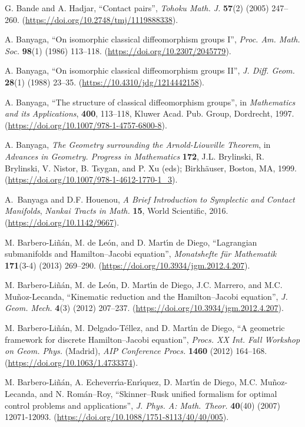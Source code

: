 \documentclass[12pt]{report}
\begin{document}
\begin{thebibliography}{999}
G. Bande and A. Hadjar, 
``Contact pairs'', 
{\sl Tohoku Math. J.} {\bf 57}(2) (2005) 247--260.
(\url{https://doi.org/10.2748/tmj/1119888338}).

A. Banyaga,
``On isomorphic classical diffeomorphism groups I'',
{\sl Proc. Am. Math. Soc.} \textbf{98}(1) (1986) 113--118.
(\url{https://doi.org/10.2307/2045779}).

A. Banyaga,
``On isomorphic classical diffeomorphism groups II'',
{\sl J. Diff. Geom.} \textbf{28}(1) (1988) 23--35.
(\url{https://10.4310/jdg/1214442158}).

A. Banyaga,
``The structure of classical diffeomorphism groups'',
in {\sl Mathematics and its Applications}, \textbf{400}, 113--118, Kluwer Acad. Pub. Group, Dordrecht, 1997.
(\url{https://doi.org/10.1007/978-1-4757-6800-8}).

A. Banyaga, 
{\it The Geometry surrounding the Arnold-Liouville Theorem},
in  {\sl Advances in Geometry. Progress in Mathematics} {\bf 172}, 
J.L. Brylinski, R. Brylinski, V. Nistor, B. Tsygan, and P. Xu (eds);
Birkh\"auser, Boston, MA, 1999. (\url{https://doi.org/10.1007/978-1-4612-1770-1_3}).

A.~Banyaga and D.F. Houenou,
{\it A Brief Introduction to Symplectic and Contact Manifolds},
{\sl Nankai Tracts in Math.} {\bf 15},
World Scientific, 2016.
(\url{https://doi.org/10.1142/9667}).

M. Barbero-Li\~n\'an, M. de Le\'on, and D. Mart\'\i n de Diego,
``Lagrangian submanifolds and Hamilton--Jacobi equation'',
 {\sl Monatshefte f\"ur Mathematik}  {\bf 171}(3-4) (2013) 269--290.
(\url{https://doi.org/10.3934/jgm.2012.4.207}).

M. Barbero-Li\~n\'an, M. de Le\'on, D. Mart\'\i n de Diego, J.C.
Marrero, and M.C. Mu\~noz-Lecanda, 
``Kinematic reduction and the Hamilton--Jacobi equation'',
 {\sl J. Geom. Mech.} {\bf 4}(3) (2012) 207--237.
(\url{https://doi.org/10.3934/jgm.2012.4.207}).

M. Barbero-Li\~{n}\'an, M. Delgado-T\'ellez, and D. Mart\'{\i}n de Diego,
``A geometric framework for discrete Hamilton--Jacobi equation'',
{\sl Procs. XX Int. Fall Workshop on Geom. Phys.} (Madrid),
\textsl{AIP Conference Procs.} \textbf{1460} (2012) 164--168.
(\url{https://doi.org/10.1063/1.4733374}).

{\rm M. Barbero-Li\~n\'an, A. Echeverr\'\i a-Enr\'\i quez,
D. Mart\' \i n de Diego, M.C. Mu\~noz-Lecanda, and N. Rom\'an--Roy},
``Skinner--Rusk unified formalism for optimal control problems and applications'',
{\sl J. Phys. A: Math. Theor.} {\bf 40}(40) (2007) 12071-12093.
(\url{https://doi.org/10.1088/1751-8113/40/40/005}).


\end{thebibliography}
\end{document}
